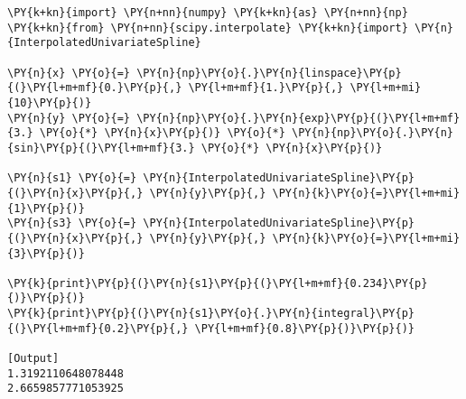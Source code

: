 \begin{Verbatim}[label=\makebox{\url{https://bitbucket.org/lbaldini/programming/src/tip/snippets/spline.py}},commandchars=\\\{\}]
\PY{k+kn}{import} \PY{n+nn}{numpy} \PY{k+kn}{as} \PY{n+nn}{np}
\PY{k+kn}{from} \PY{n+nn}{scipy.interpolate} \PY{k+kn}{import} \PY{n}{InterpolatedUnivariateSpline}

\PY{n}{x} \PY{o}{=} \PY{n}{np}\PY{o}{.}\PY{n}{linspace}\PY{p}{(}\PY{l+m+mf}{0.}\PY{p}{,} \PY{l+m+mf}{1.}\PY{p}{,} \PY{l+m+mi}{10}\PY{p}{)}
\PY{n}{y} \PY{o}{=} \PY{n}{np}\PY{o}{.}\PY{n}{exp}\PY{p}{(}\PY{l+m+mf}{3.} \PY{o}{*} \PY{n}{x}\PY{p}{)} \PY{o}{*} \PY{n}{np}\PY{o}{.}\PY{n}{sin}\PY{p}{(}\PY{l+m+mf}{3.} \PY{o}{*} \PY{n}{x}\PY{p}{)}

\PY{n}{s1} \PY{o}{=} \PY{n}{InterpolatedUnivariateSpline}\PY{p}{(}\PY{n}{x}\PY{p}{,} \PY{n}{y}\PY{p}{,} \PY{n}{k}\PY{o}{=}\PY{l+m+mi}{1}\PY{p}{)}
\PY{n}{s3} \PY{o}{=} \PY{n}{InterpolatedUnivariateSpline}\PY{p}{(}\PY{n}{x}\PY{p}{,} \PY{n}{y}\PY{p}{,} \PY{n}{k}\PY{o}{=}\PY{l+m+mi}{3}\PY{p}{)}

\PY{k}{print}\PY{p}{(}\PY{n}{s1}\PY{p}{(}\PY{l+m+mf}{0.234}\PY{p}{)}\PY{p}{)}
\PY{k}{print}\PY{p}{(}\PY{n}{s1}\PY{o}{.}\PY{n}{integral}\PY{p}{(}\PY{l+m+mf}{0.2}\PY{p}{,} \PY{l+m+mf}{0.8}\PY{p}{)}\PY{p}{)}

[Output]
1.3192110648078448
2.6659857771053925
\end{Verbatim}